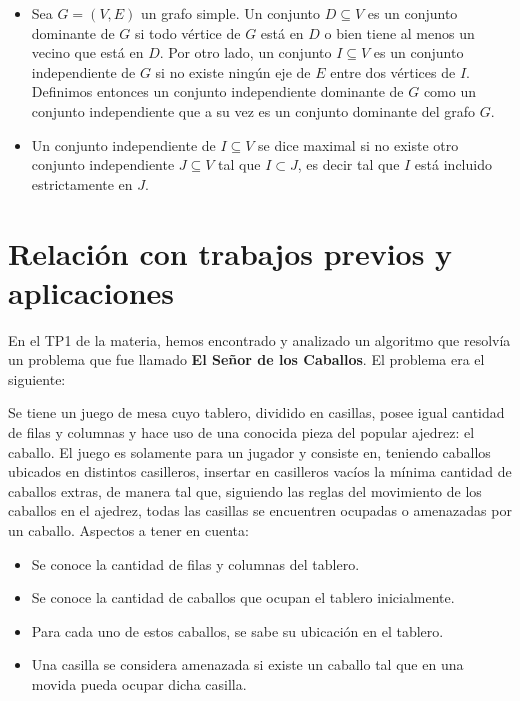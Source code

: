 \documentclass[a4paper]{article}
\begin{document}
\begin{itemize}

\item Sea $G = (V, E)$ un grafo simple. Un conjunto $D \subseteq V$ es un conjunto dominante de $G$ si todo vértice de $G$ está en $D$ o bien tiene al menos un vecino que está en $D$. Por otro lado, un conjunto $I \subseteq V$ es un conjunto independiente de $G$ si no existe ningún eje de $E$ entre dos vértices de $I$. Definimos entonces un conjunto independiente dominante de $G$ como un conjunto independiente que a su vez es un conjunto dominante del grafo $G$.

\item Un conjunto independiente de $I \subseteq V$ se dice maximal si no existe otro conjunto independiente $J \subseteq V$ tal que $I \subset J$, es decir tal que $I$ está incluido estrictamente en $J$. %

\end{itemize}

\section{Relación con trabajos previos y aplicaciones}

En el TP1 de la materia, hemos encontrado y analizado un algoritmo que resolvía un problema que fue llamado {\bf El Señor de los Caballos}. El problema era el siguiente:

Se tiene un juego de mesa cuyo tablero, dividido en casillas, posee igual cantidad de filas y columnas y hace uso de una conocida pieza del popular ajedrez: el caballo. El juego es solamente para un jugador y consiste en, teniendo caballos ubicados en distintos casilleros, insertar en casilleros vacíos la mínima cantidad de caballos extras, de manera tal que, siguiendo las reglas del movimiento de los caballos en el ajedrez, todas las casillas se encuentren ocupadas o amenazadas por un caballo.
Aspectos a tener en cuenta:

\begin{itemize}
   \item Se conoce la cantidad de filas y columnas del tablero.
   \item Se conoce la cantidad de caballos que ocupan el tablero inicialmente.
   \item Para cada uno de estos caballos, se sabe su ubicación en el tablero.
   \item Una casilla se considera amenazada si existe un caballo tal que en una movida pueda ocupar dicha casilla.
\end{itemize}
\end{document}
